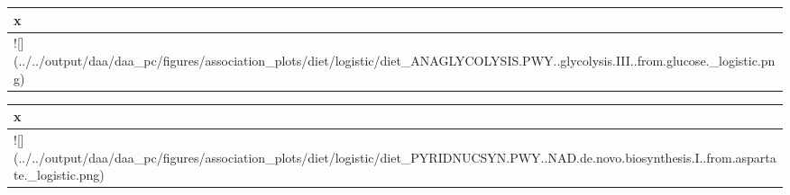 \documentclass[
]{article}
\begin{document}
\begin{table}

\centering
\begin{tabular}[t]{l}
\hline
x\\
\hline
![](../../output/daa/daa\_pc/figures/association\_plots/diet/logistic/diet\_ANAGLYCOLYSIS.PWY..glycolysis.III..from.glucose.\_logistic.png)\\
\hline
\end{tabular}
\centering
\begin{tabular}[t]{l}
\hline
x\\
\hline
![](../../output/daa/daa\_pc/figures/association\_plots/diet/logistic/diet\_PYRIDNUCSYN.PWY..NAD.de.novo.biosynthesis.I..from.aspartate.\_logistic.png)\\
\hline
\end{tabular}
\end{table}
\end{document}
